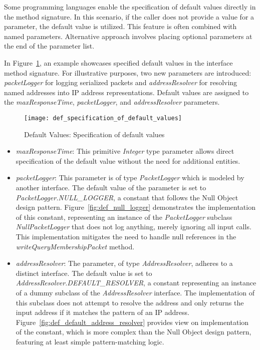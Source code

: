 Some programming languages enable the specification of default values directly in the method signature.
In this scenario, if the caller does not provide a value for a parameter, the default value is utilized.
This feature is often combined with named parameters.
Alternative approach involves placing optional parameters at the end of the parameter list.

In Figure~\ref{fig:def_specification_of_default_values}, an example showcases specified default values
in the interface method signature.
For illustrative purposes, two new parameters are introduced: \textit{packetLogger} for logging serialized packets
and \textit{addressResolver} for resolving named addresses into IP address representations.
Default values are assigned to the \textit{maxResponseTime}, \textit{packetLogger},
and \textit{addressResolver} parameters.

\begin{figure}[!htb]
    \centering
    \texttt{[image: def\_specification\_of\_default\_values]}
    \caption{Default Values: Specification of default values}
    \label{fig:def_specification_of_default_values}
\end{figure}

\begin{itemize}
    \item \textit{maxResponseTime}:
    This primitive \textit{Integer} type parameter allows direct specification of the default value without the need
    for additional entities.
    \item \textit{packetLogger}:
    This parameter is of type \textit{PacketLogger} which is modeled by another interface.
    The default value of the parameter is set to \textit{PacketLogger.NULL\_LOGGER},
    a constant that follows the Null Object design pattern.
    Figure~\ref{fig:def_null_logger} demonstrates the implementation of this constant, representing an instance
    of the \textit{PacketLogger} subclass \textit{NullPacketLogger} that does not log anything, merely ignoring
    all input calls.
    This implementation mitigates the need to handle null references in the \textit{writeQueryMembershipPacket} method.
    \item \textit{addressResolver}:
    The parameter, of type \textit{AddressResolver}, adheres to a distinct interface.
    The default value is set to \textit{AddressResolver.DEFAULT\_RESOLVER}, a constant representing an instance
    of a dummy subclass of the \textit{AddressResolver} interface.
    The implementation of this subclass does not attempt to resolve the address and only returns the input address
    if it matches the pattern of an IP address.
    Figure~\ref{fig:def_default_address_resolver} provides view on implementation of the constant,
    which is more complex than the Null Object design pattern, featuring at least simple pattern-matching logic.
\end{itemize}


